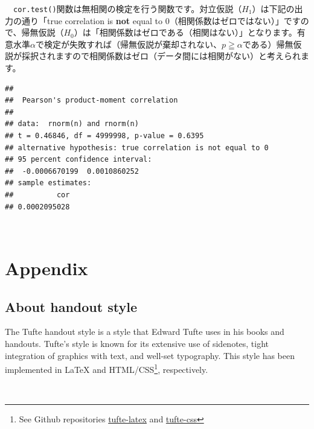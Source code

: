 \documentclass[a4paper]{tufte-handout}
\begin{document}
　\texttt{cor.test()}関数は無相関の検定を行う関数です。対立仮説（\(H_1\)）は下記の出力の通り「true
correlation is \textbf{not} equal to
0（相関係数はゼロではない）」ですので、帰無仮説（\(H_0\)）は「相関係数はゼロである（相関はない）」となります。有意水準\(\alpha\)で検定が失敗すれば（帰無仮説が棄却されない、\(p \geqq \alpha\)である）帰無仮説が採択されますので相関係数はゼロ（データ間には相関がない）と考えられます。

\begin{verbatim}
## 
##  Pearson's product-moment correlation
## 
## data:  rnorm(n) and rnorm(n)
## t = 0.46846, df = 4999998, p-value = 0.6395
## alternative hypothesis: true correlation is not equal to 0
## 95 percent confidence interval:
##  -0.0006670199  0.0010860252
## sample estimates:
##          cor 
## 0.0002095028
\end{verbatim}

　

\hypertarget{appendix}{%
\section{Appendix}\label{appendix}}

\hypertarget{about-handout-style}{%
\subsection{About handout style}\label{about-handout-style}}

The Tufte handout style is a style that Edward Tufte uses in his books
and handouts. Tufte's style is known for its extensive use of sidenotes,
tight integration of graphics with text, and well-set typography. This
style has been implemented in LaTeX and HTML/CSS\footnote{See Github
  repositories
  \href{https://github.com/tufte-latex/tufte-latex}{tufte-latex} and
  \href{https://github.com/edwardtufte/tufte-css}{tufte-css}},
respectively.

　


\end{document}
